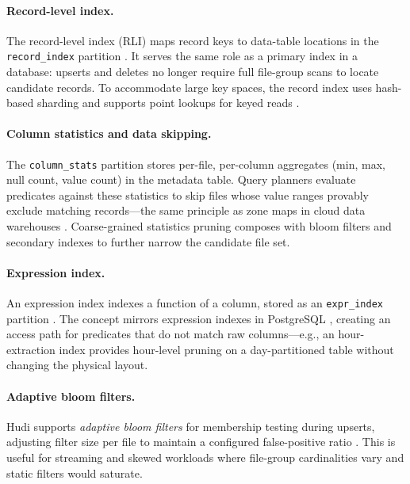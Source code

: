 \documentclass[sigconf]{acmart}
\begin{document}
\paragraph{Record-level index.}
The record-level index (RLI) maps record keys to data-table locations in the \texttt{record\_index} partition \cite{hudi-indexes,hudi-techspec}.
It serves the same role as a primary index in a database: upserts and deletes no longer require full file-group scans to locate candidate records.
To accommodate large key spaces, the record index uses hash-based sharding and supports point lookups for keyed reads \cite{hudi-indexes,hudi-rli-blog}.

\paragraph{Column statistics and data skipping.}
The \texttt{column\_stats} partition stores per-file, per-column aggregates (min, max, null count, value count) in the metadata table.
Query planners evaluate predicates against these statistics to skip files whose value ranges provably exclude matching records---the same principle as zone maps in cloud data warehouses \cite{dageville2016snowflake,edara2021bigmetadata,armenatzoglou2022redshift}.
Coarse-grained statistics pruning composes with bloom filters and secondary indexes to further narrow the candidate file set.

\paragraph{Expression index.}
An expression index indexes a function of a column, stored as an \texttt{expr\_index} partition \cite{hudi-indexes,hudi-techspec}.
The concept mirrors expression indexes in PostgreSQL \cite{pg-expr-index}, creating an access path for predicates that do not match raw columns---e.g., an hour-extraction index provides hour-level pruning on a day-partitioned table without changing the physical layout.

\paragraph{Adaptive bloom filters.}
Hudi supports \emph{adaptive bloom filters} for membership testing during upserts, adjusting filter size per file to maintain a configured false-positive ratio \cite{hudi-indexes}.
This is useful for streaming and skewed workloads where file-group cardinalities vary and static filters would saturate.
\end{document}
